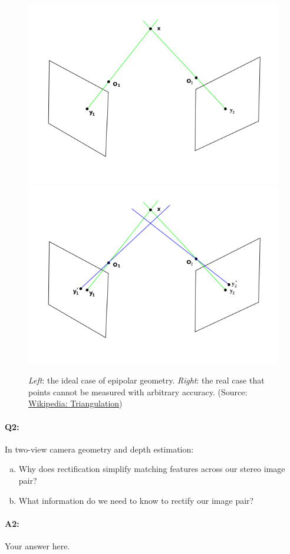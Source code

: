 \begin{enumerate}[(a)]
          \begin{figure}[htbp]
              \centering
              \includegraphics[width=0.49\linewidth]{triangulationideal.png}
              \includegraphics[width=0.49\linewidth]{TriangulationReal.png}
              \caption{\emph{Left}: the ideal case of epipolar geometry. \emph{Right}: the real case that points cannot be measured with arbitrary accuracy. (Source: \href{https://en.wikipedia.org/wiki/Triangulation_(computer_vision)}{Wikipedia: Triangulation})}
              \label{fig:triangulation}
          \end{figure}

\end{enumerate}
\pagebreak
\paragraph{Q2:} In two-view camera geometry and depth estimation:
\begin{enumerate} [(a)]
    \item Why does rectification simplify matching features across our stereo image pair?
    \item What information do we need to know to rectify our image pair?
\end{enumerate}

\paragraph{A2:} Your answer here.

